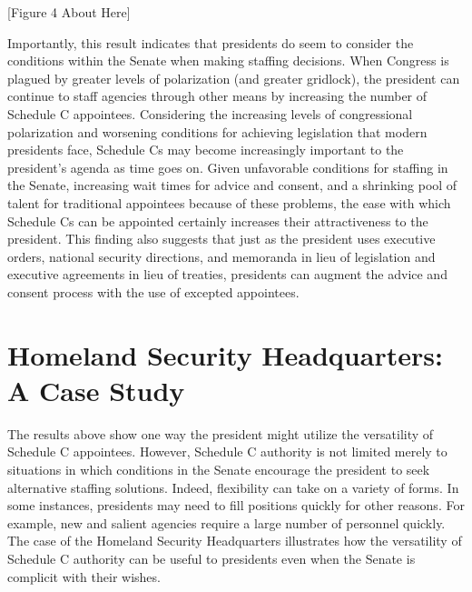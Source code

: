 \documentclass[12pt]{article}
\begin{document}
\begin{center}[Figure 4 About Here]\end{center}

Importantly, this result indicates that presidents do seem to consider the conditions within the Senate when making staffing decisions. When Congress is plagued by greater levels of polarization (and greater gridlock), the president can continue to staff agencies through other means by increasing the number of Schedule C appointees. Considering the increasing levels of congressional polarization and worsening conditions for achieving legislation that modern presidents face, Schedule Cs may become increasingly important to the president's agenda as time goes on. Given unfavorable conditions for staffing in the Senate, increasing wait times for advice and consent, and a shrinking pool of talent for traditional appointees because of these problems, the ease with which Schedule Cs can be appointed certainly increases their attractiveness to the president. This finding also suggests that just as the president uses executive orders, national security directions, and memoranda in lieu of legislation and executive agreements in lieu of treaties, presidents can augment the advice and consent process with the use of excepted appointees.

\section*{Homeland Security Headquarters: A Case Study}
The results above show one way the president might utilize the versatility of Schedule C appointees. However, Schedule C authority is not limited merely to situations in which conditions in the Senate encourage the president to seek alternative staffing solutions. Indeed, flexibility can take on a variety of forms. In some instances, presidents may need to fill positions quickly for other reasons. For example, new and salient agencies require a large number of personnel quickly. The case of the Homeland Security Headquarters illustrates how the versatility of Schedule C authority can be useful to presidents even when the Senate is complicit with their wishes. 
\end{document}
